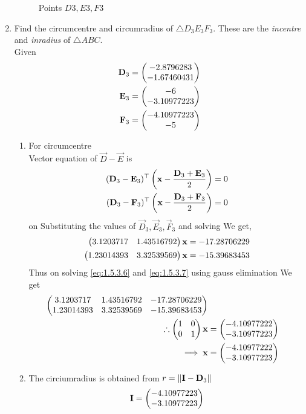 \documentclass[11pt]{book}
\begin{document}
\begin{enumerate}[label=\thesection.\arabic*.,ref=\thesection.\theenumi]
\begin{figure}[H]
\caption{Points $D3,E3,F3$}
\label{fig:fig1}
\end{figure}
\item Find the circumcentre and circumradius of $\triangle D_3E_3F_3$.  These are the {\em incentre} and {\em inradius} of $\triangle ABC$. \\
\solution Given 
\begin{align}
    \mathbf{D}_3 &= \begin{pmatrix}-2.8796283  \\ -1.67460431\end{pmatrix} \\
    \mathbf{E}_3 &= \begin{pmatrix}-6  \\ -3.10977223\end{pmatrix} \\
    \mathbf{F}_3 &= \begin{pmatrix}-4.10977223  \\ -5\end{pmatrix} 
\end{align}
\begin{enumerate}
\item For circumcentre \\
Vector equation of $\vec{D}-\vec{E}$ is
\begin{align}
(\mathbf{D}_3-\mathbf{E}_3)^\top\left( \mathbf{x} - \frac{\mathbf{D}_3+\mathbf{E}_3}{2}\right) = 0 \\
(\mathbf{D}_3-\mathbf{F}_3)^\top\left( \mathbf{x} - \frac{\mathbf{D}_3+\mathbf{F}_3}{2}\right) = 0
\end{align}
on Substituting the values of $\vec{D}_3, \vec{E}_3, \vec{F}_3$ and solving We get,
\begin{align}
     \myvec{3.1203717 & 1.43516792}\vec{x} &= -17.28706229 \label{eq:1.5.3.6} \\
     \myvec{1.23014393 & 3.32539569}\vec{x} &= -15.39683453 \label{eq:1.5.3.7}
\end{align}
Thus on solving \eqref{eq:1.5.3.6} and \eqref{eq:1.5.3.7} using gauss elimination We get
\begin{align}
    \begin{pmatrix} 3.1203717 & 1.43516792 & -17.28706229 \\ 1.23014393 & 3.32539569 & -15.39683453\end{pmatrix} \\
    \therefore \begin{pmatrix}1&0\\0&1\end{pmatrix}\mathbf{x} &= \begin{pmatrix}-4.10977222 \\ -3.10977223\end{pmatrix}\\
\implies \mathbf{x}&=\begin{pmatrix}-4.10977222 \\ -3.10977223\end{pmatrix}
\end{align}
\item The circiumradius is obtained from  $ r=\left\lVert\mathbf{I}-\mathbf{D}_3\right\rVert$
   \begin{align}
       \vec{I} &= \myvec{-4.10977223 \\ -3.10977223} \\

\end{align}
\end{enumerate}
\end{enumerate}
\end{document}
